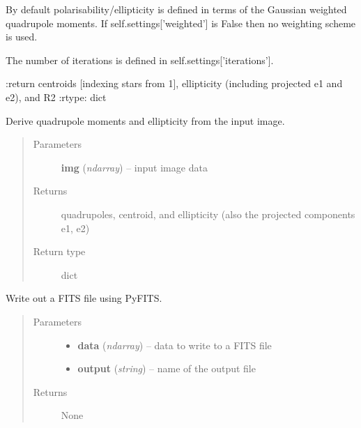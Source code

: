 \documentclass[a4paper,11pt,english]{sphinxmanual}
\begin{document}
\begin{fulllineitems}
\begin{fulllineitems}
By default polarisability/ellipticity is defined in terms of the Gaussian weighted quadrupole moments.
If self.settings{[}'weighted'{]} is False then no weighting scheme is used.

The number of iterations is defined in self.settings{[}'iterations'{]}.

:return centroids {[}indexing stars from 1{]}, ellipticity (including projected e1 and e2), and R2
:rtype: dict

\end{fulllineitems}


\begin{fulllineitems}
\label{analysis:analysis.shape.shapeMeasurement.quadrupoles}
Derive quadrupole moments and ellipticity from the input image.
\begin{quote}\begin{description}
\item[{Parameters}] \leavevmode
\textbf{img} (\emph{ndarray}) -- input image data

\item[{Returns}] \leavevmode
quadrupoles, centroid, and ellipticity (also the projected components e1, e2)

\item[{Return type}] \leavevmode
dict

\end{description}\end{quote}

\end{fulllineitems}


\begin{fulllineitems}
\label{analysis:analysis.shape.shapeMeasurement.writeFITS}
Write out a FITS file using PyFITS.
\begin{quote}\begin{description}
\item[{Parameters}] \leavevmode\begin{itemize}
\item {} 
\textbf{data} (\emph{ndarray}) -- data to write to a FITS file

\item {} 
\textbf{output} (\emph{string}) -- name of the output file

\end{itemize}

\item[{Returns}] \leavevmode
None

\end{description}\end{quote}

\end{fulllineitems}


\end{fulllineitems}
\end{document}
